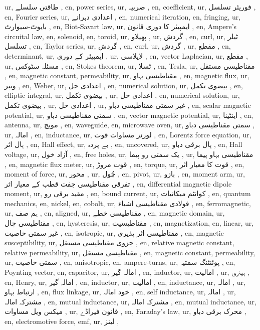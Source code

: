 ur, طاقتی سلسلے ,
en, power series,
ur, ضربیہ ,
en, coefficient,
ur, فوریئر تسلسل ,
en, Fourier series,
ur, اعدادی دہرانے ,
en, numerical iteration,
en, fringing,
ur, بایوٹ-سیوارٹ ,
en, Biot-Savart law,
ur, ایمپیئر کا دوری قانون ,
en, Ampere's circuital law,
en, solenoid,
en, toroid,
ur, پھیلاو ,
ur, گردش ,
en, curl,
ur, ٹیلر تسلسل ,
en, Taylor series,
ur, گردش ,
en, curl,
ur, گردش ,
ur, مقطع ,
en, determinant,
ur, ایمپیئر کے دوری ,
ur, لاپلاسی ,
en, vector Laplacian,
ur, مقطع ,
ur, مسئلہ سٹوکس ,
en, Stokes theorem,
ur, ٹسلا ,
en, Tesla,
ur, مقناطیسی مستقل ,
en, magnetic constant, permeability,
ur, مقناطیسی بہاو ,
en, magnetic flux,
ur, ویبر ,
en, Weber,
ur, اعدادی حل ,
en, numerical solution,
ur, بیضوی تکمل ,
en, elliptic integral,
ur, بیضوی تکمل ,
ur, اعدادی حل ,
en, numerical solution,
ur, بیضوی تکمل ,
ur, اعدادی حل ,
ur, غیر سمتی مقناطیسی دباو ,
en, scalar magnetic potential,
ur, سمتی مقناطیسی دباو ,
en, vector magnetic potential,
ur, اینٹینا ,
en, antenna,
ur, مویج ,
en, waveguide,
en, microwave oven,
ur, سمتی مقناطیسی دباو ,
ur,  امالہ ,
en, inductance,
ur, لورنز مساوات قوت ,
en, Lorentz force equation,
ur, ہال اثر ,
en, Hall effect,
ur, بے پردہ ,
en, uncovered,
ur, ہال برقی دباو ,
en, Hall voltage,
ur, آزاد خول ,
en, free holes,
ur, یک سمتی رو پیما ,
ur, مقناطیسی بہاو پیما ,
en, magnetic flux meter,
ur, قوت مروڑ ,
en, torque,
ur, قوت کا معیار اثر ,
en, moment of force,
ur, محور ,
ur, چُول ,
en, pivot,
ur, بازو ,
en, moment arm,
ur, تفرقی مقناطیسی جفت قطب کے معیار اثر ,
en, differential magnetic dipole moment,
ur, مقید برقی رو ,
en, bound current,
ur, کوانٹم میکانیات ,
en, quantum mechanics,
en, nickel,
en, cobolt,
ur, فولادی مقناطیسی اشیاء ,
en, ferromagnetic,
ur, ہم صف ,
en, aligned,
ur, مقناطیسی خطے ,
en, magnetic domain,
ur, مقناطیسی چال ,
en, hysteresis,
ur, مقناطیسیت ,
en, magnetization,
en, linear,
ur, غیر سمتی خاصیت ,
en, isotropic,
ur, مقناطیسی اثر پذیری ,
en, magnetic susceptibility,
ur, جزوی مقناطیسی مستقل ,
en, relative magnetic constant, relative permeability,
ur, مقناطیسی مستقل ,
en, magnetic constant, permeability,
ur, سمتی خاصیت ,
en, anisotropic,
en, ampere-turns,
ur, پوئنٹنگ سمتیہ ,
en, Poynting vector,
en, capacitor,
ur, امالہ گیر ,
en, inductor,
ur, امالیت ,
ur, ہینری ,
en, Henry,
ur, امالہ گیر ,
en, inductor,
ur, امالیت ,
en, inductance,
ur, امالہ ,
ur, ارتباط بہاو ,
en, flux linkage,
ur, خود امالہ ,
en, self inductance,
ur, امالہ ,
ur, مشترکہ امالہ ,
en, mutual inductance,
ur, مشترکہ امالہ ,
en, mutual inductance,
ur, میکس ویل مساوات ,
ur, قانون فیراڈے ,
en, Faraday's law,
ur, محرک برقی دباو ,
en, electromotive force, emf,
ur, لینز ,
